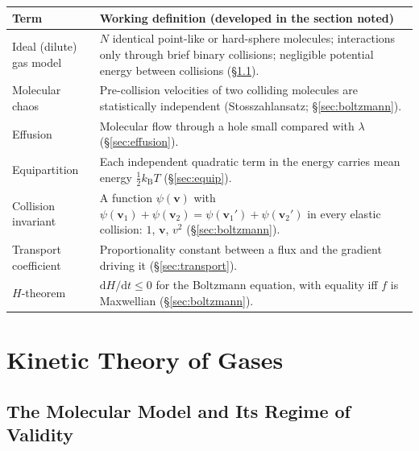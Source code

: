 \documentclass[11pt,a4paper]{report}
\theoremstyle{definition}
\theoremstyle{plain}
\newcommand{\kB}{k_{\mathrm{B}}}
\newcommand{\dd}{\mathrm{d}}
\newcommand{\vv}{\mathbf{v}}
\begin{document}
\begin{center}
\small
\begin{tabular}{@{}p{3.2cm}p{11.8cm}@{}}
\toprule
Term & Working definition (developed in the section noted)\\
\midrule
Ideal (dilute) gas model & $N$ identical point-like or hard-sphere molecules; interactions only through brief binary collisions; negligible potential energy between collisions (\S\ref{sec:model}).\\
Molecular chaos & Pre-collision velocities of two colliding molecules are statistically independent (Stosszahlansatz; \S\ref{sec:boltzmann}).\\
Effusion & Molecular flow through a hole small compared with $\lambda$ (\S\ref{sec:effusion}).\\
Equipartition & Each independent quadratic term in the energy carries mean energy $\tfrac12\kB T$ (\S\ref{sec:equip}).\\
Collision invariant & A function $\psi(\vv)$ with $\psi(\vv_1)+\psi(\vv_2)=\psi(\vv_1')+\psi(\vv_2')$ in every elastic collision: $1$, $\vv$, $v^2$ (\S\ref{sec:boltzmann}).\\
Transport coefficient & Proportionality constant between a flux and the gradient driving it (\S\ref{sec:transport}).\\
$H$-theorem & $\dd H/\dd t\le 0$ for the Boltzmann equation, with equality iff $f$ is Maxwellian (\S\ref{sec:boltzmann}).\\
\bottomrule
\end{tabular}
\end{center}

\chapter{Kinetic Theory of Gases}
\label{ch:ktg}

\section{The Molecular Model and Its Regime of Validity}
\label{sec:model}
\end{document}
